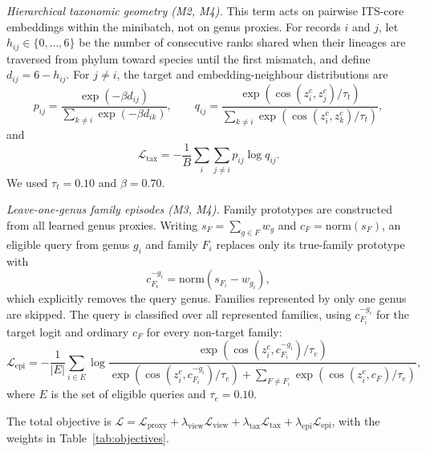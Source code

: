 \documentclass[11pt]{article}
\begin{document}
\noindent\emph{Hierarchical taxonomic geometry (M2, M4).} This term acts on
pairwise ITS-core embeddings within the minibatch, not on genus proxies. For
records $i$ and $j$, let $h_{ij}\in\{0,\ldots,6\}$ be the number of consecutive
ranks shared when their lineages are traversed from phylum toward species until
the first mismatch, and define $d_{ij}=6-h_{ij}$. For $j\neq i$, the target and
embedding-neighbour distributions are
\begin{equation}
p_{ij}=\frac{\exp(-\beta d_{ij})}{\sum_{k\neq i}\exp(-\beta d_{ik})},
\qquad
q_{ij}=\frac{\exp(\cos(z_i^c,z_j^c)/\tau_t)}
{\sum_{k\neq i}\exp(\cos(z_i^c,z_k^c)/\tau_t)},
\end{equation}
and
\begin{equation}
\mathcal{L}_{\mathrm{tax}}
= -\frac{1}{B}\sum_i\sum_{j\neq i} p_{ij}\log q_{ij}.
\label{eq:tax}
\end{equation}
We used $\tau_t=0.10$ and $\beta=0.70$.

\noindent\emph{Leave-one-genus family episodes (M3, M4).} Family prototypes
are constructed from all learned genus proxies. Writing
$s_F=\sum_{g\in F}w_g$ and $c_F=\mathrm{norm}(s_F)$, an eligible query from
genus $g_i$ and family $F_i$ replaces only its true-family prototype with
\begin{equation}
c_{F_i}^{-g_i}=\mathrm{norm}(s_{F_i}-w_{g_i}),
\end{equation}
which explicitly removes the query genus. Families represented by only one genus
are skipped. The query is classified over all represented families, using
$c_{F_i}^{-g_i}$ for the target logit and ordinary $c_F$ for every non-target
family:
\begin{equation}
\mathcal{L}_{\mathrm{epi}}
= -\frac{1}{|E|}\sum_{i\in E}
\log\frac{\exp(\cos(z_i^c,c_{F_i}^{-g_i})/\tau_e)}
{\exp(\cos(z_i^c,c_{F_i}^{-g_i})/\tau_e)
+\sum_{F\neq F_i}\exp(\cos(z_i^c,c_F)/\tau_e)},
\label{eq:epi}
\end{equation}
where $E$ is the set of eligible queries and $\tau_e=0.10$.

The total objective is
$\mathcal{L}=\mathcal{L}_{\mathrm{proxy}}
+\lambda_{\mathrm{view}}\mathcal{L}_{\mathrm{view}}
+\lambda_{\mathrm{tax}}\mathcal{L}_{\mathrm{tax}}
+\lambda_{\mathrm{epi}}\mathcal{L}_{\mathrm{epi}}$, with the weights in
Table~\ref{tab:objectives}.


\end{document}
